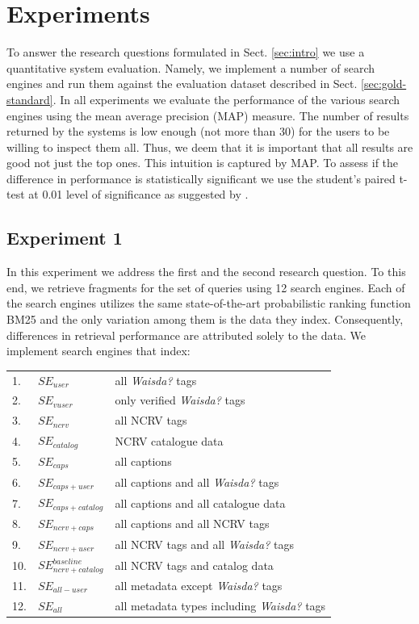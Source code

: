 \section{Experiments}\label{sec:experimental-setup}
To answer the research questions formulated in Sect. \ref{sec:intro} we use a quantitative system evaluation. Namely, we implement a number of search engines and run them against the evaluation dataset described in Sect. \ref{sec:gold-standard}. In all experiments we evaluate the performance of the various search engines using the mean average precision (MAP) measure. The number of results returned by the systems is low enough (not more than 30) for the users to be willing to inspect them all. Thus, we deem that it is important that all results are good not just the top ones. This intuition is captured by MAP. To assess if the difference in performance is statistically significant we use the student's paired t-test at 0.01 level of significance as suggested by \cite{stat-sig}.

\subsection{Experiment 1}\label{sec:experiment1-setup}
In this experiment we address the first and the second research question. To this end, we retrieve fragments for the set of queries using 12 search engines. Each of the search engines utilizes the same state-of-the-art probabilistic ranking function BM25 and the only variation among them is the data they index. Consequently, differences in retrieval performance are attributed solely to the data. We implement search engines that index:

\begin{tabular}{lll}
 1. & $SE_{user}$  & all \textit{Waisda?} tags \\
 2. & $SE_{vuser}$& only verified \textit{Waisda?} tags \\
 3. & $SE_{ncrv}$& all NCRV tags \\
 4. & $SE_{catalog}$&  NCRV catalogue data \\
 5. & $SE_{caps}$& all captions\\
 6. & $SE_{caps+user}$&  all captions and all \textit{Waisda?} tags \\
 7. & $SE_{caps+catalog}$& all captions and all catalogue data \\
 8. & $SE_{ncrv+caps}$&  all captions and all NCRV tags \\
 9. & $SE_{ncrv+user}$&  all NCRV tags and all \textit{Waisda?}  tags \\
 10. & $SE_{ncrv+catalog}^{baseline}$& all NCRV tags and catalog data \\
 11. & $SE_{all-user}$&  all metadata  except  \textit{Waisda?} tags \\
 12. & $SE_{all}$&  all metadata types including  \textit{Waisda?}  tags \\
\end{tabular}

